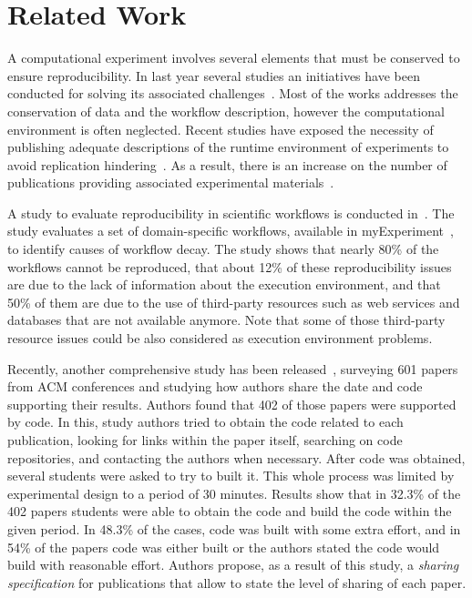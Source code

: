 \section{Related Work}
\label{sec:related-work}

A computational experiment involves several elements that must be conserved 
to ensure reproducibility. In last year several studies an initiatives have been 
conducted for solving its associated challenges~\cite{Hothorn01052011,Sylwester14}. 
Most of the works addresses the conservation of data and the workflow description, 
however the computational environment is often neglected. Recent studies have 
exposed the necessity of publishing adequate descriptions of the runtime environment of experiments to avoid replication hindering~\cite{Rollins201459}. As a result, there is an increase on the number of publications 
providing associated experimental materials~\cite{Brown2012, diginorm}.

A study to evaluate reproducibility in scientific workflows is conducted in~\cite{zhao2012}. The study evaluates a set of domain-specific workflows, available in  myExperiment~\cite{myExperiment}, to identify causes of workflow decay. The study shows that nearly 80\% of the workflows cannot be reproduced, that about 12\% of these reproducibility issues are due to the lack of information about the execution environment, and that 50\% of them are due to the use of third-party resources such as web services and databases that are not available anymore. Note that some of those third-party resource issues could be also considered as execution environment problems. 

Recently, another comprehensive study has been released~\cite{Collberg2015}, surveying 601 papers from ACM conferences and studying how authors share the date and code supporting their results. Authors found that 402 of those papers were supported by code. In this, study authors tried to obtain the code related to each publication, looking for links within the paper itself, searching on code repositories, and contacting the authors when necessary. After code was obtained, several students were asked to try to built it. This whole process was limited by experimental design to a period of 30 minutes. Results show that in 32.3\% of the 402 papers students were able to obtain the code and build the code within the given period. In 48.3\% of the cases, code was built with some extra effort, and in 54\% of the papers code was either built or the authors stated the code would build with reasonable effort. Authors propose, as a result of this study, a {\it sharing specification} for publications that allow to state the level of sharing of each paper.

